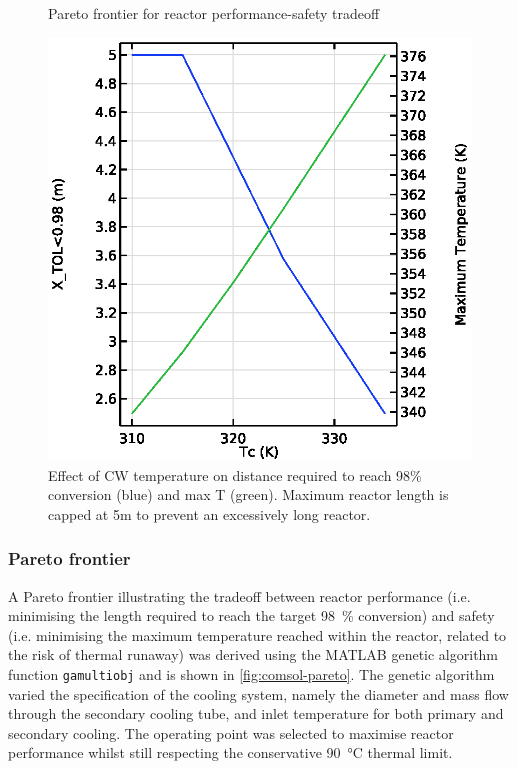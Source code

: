 \begin{figure}[h]
\begin{minipage}[t]{0.32\linewidth}
        \caption{Pareto frontier for reactor performance-safety tradeoff}
        \label{fig:comsol-pareto}
    \end{minipage}\hfill
    \begin{minipage}[t]{0.32\linewidth}
        \includegraphics[width=\linewidth]{figures/S4-CW-X-T.eps}
        \caption{Effect of CW temperature on distance required to reach 98\% conversion (blue) and max T (green). Maximum reactor length is capped at 5m to prevent an excessively long reactor.}
        \label{fig:comsol-S4-CW-X-T}
    \end{minipage}
\end{figure}

\subsubsection{Pareto frontier}
A Pareto frontier illustrating the tradeoff between reactor performance (i.e. minimising the length required to reach the target \SI{98}{\percent} conversion) and safety (i.e. minimising the maximum temperature reached within the reactor, related to the risk of thermal runaway) was derived using the MATLAB genetic algorithm function \texttt{gamultiobj} and is shown in \cref{fig:comsol-pareto}. The genetic algorithm varied the specification of the cooling system, namely the diameter and mass flow through the secondary cooling tube, and inlet temperature for both primary and secondary cooling. The operating point was selected to maximise reactor performance whilst still respecting the conservative \SI{90}{\celsius} thermal limit.

